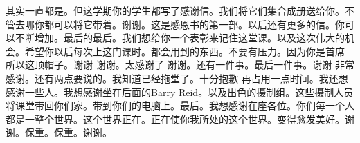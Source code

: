 其实一直都是。但这学期你的学生都写了感谢信。我们将它们集合成册送给你。不管去哪你都可以将它带着。谢谢。这是感恩书的第一部。以后还有更多的信。你可以不断增加。最后的最后。我们想给你一个表彰来记住这堂课。以及这次伟大的机会。希望你以后每次上这门课时。都会用到的东西。不要有压力。因为你是首席 所以这顶帽子。谢谢 谢谢。太感谢了 谢谢。还有一件事。最后一件事。谢谢 非常感谢。还有两点要说的。我知道已经拖堂了。十分抱歉 再占用一点时间。我还想感谢一些人。我想感谢坐在后面的Barry Reid。以及出色的摄制组。这些摄制人员将课堂带回你们家。带到你们的电脑上。最后。我想感谢在座各位。你们每一个人都是一整个世界。这个世界正在。正在使你我所处的这个世界。变得愈发美好。谢谢。保重。保重。谢谢。 
